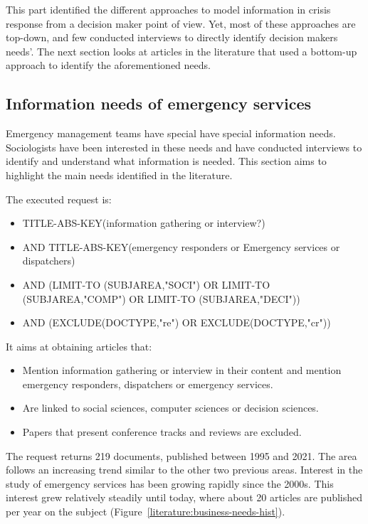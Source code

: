 This part identified the different approaches to model information in crisis response from a decision maker point of view.
Yet, most of these approaches are top-down, and few conducted interviews to directly identify decision makers needs'.
The next section looks at articles in the literature that used a bottom-up approach to identify the aforementioned needs.

\subsection{Information needs of emergency services}
Emergency management teams have special have special information needs.
Sociologists have been interested in these needs and have conducted interviews to identify and understand what information is needed.
This section aims to highlight the main needs identified in the literature.

The executed request is:

\begin{itemize}
    \item TITLE-ABS-KEY({information gathering} or interview?)
    \item AND TITLE-ABS-KEY({emergency responders} or {Emergency services} or {dispatchers})
    \item AND (LIMIT-TO (SUBJAREA,"SOCI") OR LIMIT-TO (SUBJAREA,"COMP") OR LIMIT-TO (SUBJAREA,"DECI"))
    \item AND (EXCLUDE(DOCTYPE,"re") OR EXCLUDE(DOCTYPE,"cr"))
\end{itemize}

It aims at obtaining articles that:

\begin{itemize}
    \item Mention information gathering or interview in their content and mention emergency responders, dispatchers or emergency services.
    \item Are linked to social sciences, computer sciences or decision sciences.
    \item Papers that present conference tracks and reviews are excluded.
\end{itemize}

The request returns 219 documents, published between 1995 and 2021.
The area follows an increasing trend similar to the other two previous areas.
Interest in the study of emergency services has been growing rapidly since the 2000s.
This interest grew relatively steadily until today, where about 20 articles are published per year on the subject (Figure~\ref{literature:business-needs-hist}).

